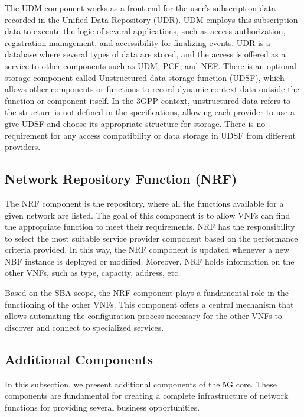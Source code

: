 The UDM component works as a front-end for the user's subscription data recorded in the Unified Data Repository (UDR). UDM employs this subscription data to execute the logic of several applications, such as access authorization, registration management, and accessibility for finalizing events. UDR is a database where several types of data are stored, and the access is offered as a service to other components such as UDM, PCF, and NEF. There is an optional storage component called Unstructured data storage function (UDSF), which allows other components or functions to record dynamic context data outside the function or component itself. In the 3GPP context, unstructured data refers to the structure is not defined in the specifications, allowing each provider to use a give UDSF and choose its appropriate structure for storage. There is no requirement for any access compatibility or data storage in UDSF from different providers. 


\subsection*{Network Repository Function (NRF)}

The NRF component is the repository, where all the functions available for a given network are listed. The goal of this component is to allow VNFs can find the appropriate function to meet their requirements. NRF has the responsibility to select the most suitable service provider component based on the performance criteria provided. In this way, the NRF component is updated whenever a new NBF instance is deployed or modified. Moreover, NRF holds information on the other VNFs, such as type, capacity, address, etc.

Based on the SBA scope, the NRF component plays a fundamental role in the functioning of the other VNFs. This component offers a central mechanism that allows automating the configuration process necessary for the other VNFs to discover and connect to specialized services. 


\subsection{Additional Components}

In this subsection, we present additional components of the 5G core. These components are fundamental for creating a complete infrastructure of network functions for providing several business opportunities.



